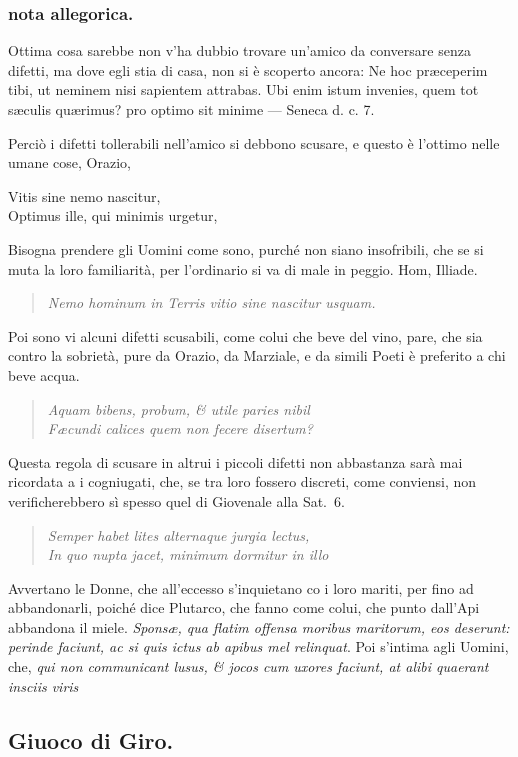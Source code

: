 \documentclass[11pt,a6paper]{article}
\newcommand{\literaryquote}[1]{%
\kern -6pt  \begin{verse}
    {\footnotesize \it #1}
  \end{verse}\kern -2pt%
}
\begin{document}
\subsubsection{nota allegorica.}
{\footnotesize
Ottima cosa sarebbe non v'ha dubbio trovare
un'amico da conversare senza difetti, ma dove egli
stia di casa, non si è scoperto ancora: Ne hoc præceperim
tibi, ut neminem nisi sapientem attrabas.
Ubi enim istum invenies, quem tot sæculis quærimus?
pro optimo sit minime — Seneca d. c. 7.

Perciò i difetti tollerabili nell'amico si debbono
scusare, e questo è l'ottimo nelle umane cose, Orazio,

 Vitis sine nemo nascitur,\\
 Optimus ille, qui minimis urgetur,

Bisogna prendere gli Uomini come sono, purché
non siano insofribili, che se si muta la loro familiarità,
per l'ordinario si va di male in peggio. Hom,
Illiade.

\literaryquote{Nemo hominum in Terris vitio sine nascitur usquam.}

Poi sono vi alcuni difetti scusabili, come colui che
beve del vino, pare, che sia contro la sobrietà, pure
da Orazio, da Marziale, e da simili Poeti è preferito
a chi beve acqua.

\literaryquote{Aquam bibens, probum, \& utile paries nibil\\
 Fæcundi calices quem non fecere disertum?}

Questa regola di scusare in altrui i piccoli difetti
non abbastanza sarà mai ricordata a i cogniugati,
che, se tra loro fossero discreti, come conviensi,
non verificherebbero sì spesso quel di Giovenale
alla Sat.~6.

\literaryquote{Semper habet lites alternaque jurgia lectus,\\
In quo nupta jacet, minimum dormitur in illo}

Avvertano le Donne, che all'eccesso s'inquietano
co i loro mariti, per fino ad abbandonarli, poiché
dice Plutarco, che fanno come colui, che punto
dall'Api abbandona il miele. \textit{Sponsæ, qua flatim
offensa moribus maritorum, eos deserunt: perinde
faciunt, ac si quis ictus ab apibus mel relinquat}.
Poi s'intima agli Uomini, che, \textit{qui non communicant
lusus, \& jocos cum uxores faciunt, at alibi
quaerant insciis viris}
}





\subsection{Giuoco di Giro.}
\end{document}
